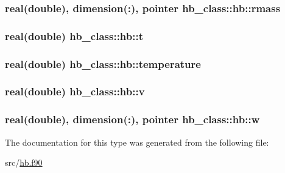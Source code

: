 \hypertarget{structhb__class_1_1hb_adc2ac99589f86766e4d80c7a2d8eaa0c}{
\subsubsection[{rmass}]{\setlength{\rightskip}{0pt plus 5cm}real(double), dimension(\-:), pointer hb\-\_\-class\-::hb\-::rmass\hspace{0.3cm}{\ttfamily [private]}}}\label{structhb__class_1_1hb_adc2ac99589f86766e4d80c7a2d8eaa0c}
\hypertarget{structhb__class_1_1hb_aa9a64f5f6e1c6b43e49f4f369cc36122}{
\subsubsection[{t}]{\setlength{\rightskip}{0pt plus 5cm}real(double) hb\-\_\-class\-::hb\-::t\hspace{0.3cm}{\ttfamily [private]}}}\label{structhb__class_1_1hb_aa9a64f5f6e1c6b43e49f4f369cc36122}
\hypertarget{structhb__class_1_1hb_a5d5e5ee121dffd96571df21b84b83507}{
\subsubsection[{temperature}]{\setlength{\rightskip}{0pt plus 5cm}real(double) hb\-\_\-class\-::hb\-::temperature\hspace{0.3cm}{\ttfamily [private]}}}\label{structhb__class_1_1hb_a5d5e5ee121dffd96571df21b84b83507}
\hypertarget{structhb__class_1_1hb_ac20e5692850cd29066ed51b1f51b65ab}{
\subsubsection[{v}]{\setlength{\rightskip}{0pt plus 5cm}real(double) hb\-\_\-class\-::hb\-::v\hspace{0.3cm}{\ttfamily [private]}}}\label{structhb__class_1_1hb_ac20e5692850cd29066ed51b1f51b65ab}
\hypertarget{structhb__class_1_1hb_aa5b032073db26bbc82430e5dcefa77a6}{
\subsubsection[{w}]{\setlength{\rightskip}{0pt plus 5cm}real(double), dimension(\-:), pointer hb\-\_\-class\-::hb\-::w\hspace{0.3cm}{\ttfamily [private]}}}\label{structhb__class_1_1hb_aa5b032073db26bbc82430e5dcefa77a6}


The documentation for this type was generated from the following file\-:\begin{DoxyCompactItemize}
\item 
src/\hyperlink{hb_8f90}{hb.\-f90}\end{DoxyCompactItemize}

